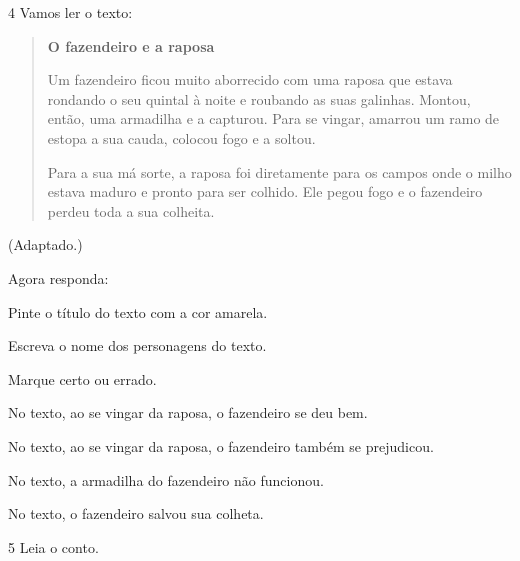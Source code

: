 \num{4} Vamos ler o texto:


\begin{quote}
\textbf{O fazendeiro e a raposa}

Um fazendeiro ficou muito aborrecido com uma raposa que estava rondando o
seu quintal à noite e roubando as suas galinhas. Montou, então, uma
armadilha e a capturou. Para se vingar, amarrou um ramo de estopa
a sua cauda, colocou fogo e a soltou.

Para a sua má sorte, a raposa foi diretamente para os campos onde o milho
estava maduro e pronto para ser colhido. Ele pegou fogo e o fazendeiro perdeu toda a sua colheita.
\end{quote}

 (Adaptado.)

Agora responda:

\begin{escolha}
\item Pinte o título do texto com a cor amarela.

\item Escreva o nome dos personagens do texto.


\item Marque certo ou errado.

\begin{boxlist}
\boxitem[] No texto, ao se vingar da raposa, o fazendeiro se deu bem.

\boxitem[] No texto, ao se vingar da raposa, o fazendeiro também se prejudicou.

\boxitem[] No texto, a armadilha do fazendeiro não funcionou.

\boxitem[] No texto, o fazendeiro salvou sua colheta.
\end{boxlist}
\end{escolha}

\num{5} Leia o conto.


